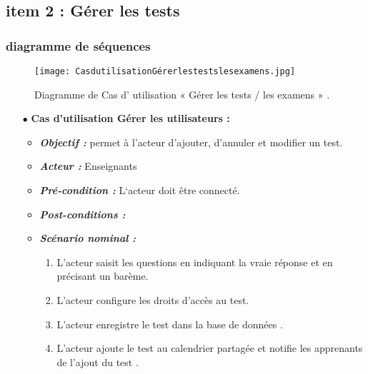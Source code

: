 















\clearpage
\subsection{item 2 : Gérer les  tests}

\subsubsection{diagramme de séquences }
\begin{figure}[ht]
	\centering
	\texttt{[image: CasdutilisationGérerlestestslesexamens.jpg]}
	\caption{Diagramme de Cas d' utilisation « Gérer les tests / les examens » .}
	\label{fig:Diagramme de Cas d' utilisation  Gérer les tests / les examens  }
\end{figure}
\FloatBarrier

\begin{itemize}
	\item[$\bullet$] \textbf{Cas d’utilisation Gérer les utilisateurs :} 
	\medskip
	\begin{itemize}
		\item \textit{\textbf{Objectif :}} permet à l’acteur d’ajouter, d’annuler et modifier un test.
		\item \textit{\textbf{Acteur :}} Enseignants
		
		\item \textit{\textbf{Pré-condition  :}} L‘acteur doit être connecté.
		\item \textit{\textbf{Post-conditions   :}}
		\item \textit{\textbf{Scénario nominal :}}
		\begin{enumerate} 
			\item  L’acteur saisit les questions en indiquant la vraie réponse et en précisant un barème. 
			\item    L’acteur configure les droits d’accès au test. 
			\item   L’acteur enregistre le test dans la base de données .  
			\item L’acteur ajoute le test au calendrier partagée et notifie les apprenants de l’ajout du test .
		\end{enumerate}
	\end{itemize}
\end{itemize}	
\bigskip
